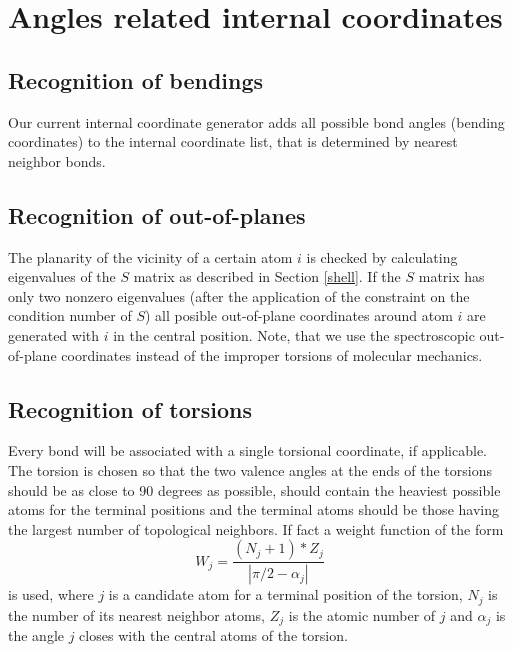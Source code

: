 \documentclass[prl,aps,preprint,superbib,12pt]{revtex4}
\begin{document}
\section{Angles related internal coordinates}
\subsection{Recognition of bendings}
Our current internal coordinate generator adds all possible bond
angles (bending coordinates) to the internal coordinate list,
that is determined by nearest neighbor bonds.

\subsection{Recognition of out-of-planes}
The planarity of the vicinity of a certain atom $i$ is checked
by calculating eigenvalues of the $S$ matrix as described in Section
\ref{shell}. If the $S$ matrix has only two nonzero eigenvalues
(after the application of the constraint on the condition number of $S$)
all posible out-of-plane coordinates around atom $i$ are generated
with $i$ in the central position. Note, that we use the spectroscopic
out-of-plane coordinates \cite{EWilson55} instead of the
improper torsions of molecular mechanics.

\subsection{Recognition of torsions}
Every bond will be associated with a single torsional coordinate,
if applicable. The torsion is chosen so that the two valence angles
at the ends of the torsions should be as close to 90 degrees as 
possible, should contain the heaviest possible atoms for the terminal
positions and the terminal atoms should be those having the largest
number of topological neighbors. If fact a weight function of the form
\begin{equation}
W_{j} = \frac{(N_{j}+1)*Z_{j}}{|\pi/2-\alpha_{j}|}
\end{equation}
is used, where $j$ is a candidate atom for a terminal position of the torsion,
$N_{j}$ is the number of its nearest neighbor atoms, $Z_{j}$ is
the atomic number of $j$ and $\alpha_{j}$ is the angle $j$ closes
with the central atoms of the torsion.
\end{document}
